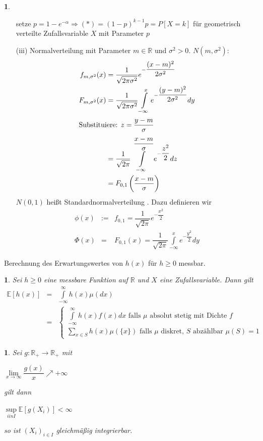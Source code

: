 \documentclass[10pt,a4paper]{report}
\newcommand{\E}{\mathbb{E}}
\newcommand{\R}{\mathbb{R}}
\numberwithin{equation}{section}
\numberwithin{figure}{section}
\theoremstyle{plain}
\theoremstyle{definition}
\newtheorem{example}[thm]{\protect\examplename}
\theoremstyle{remark}
\theoremstyle{plain}
\newtheorem{prop}[thm]{\protect\propositionname}
\providecommand{\examplename}{Beispiel}
\providecommand{\propositionname}{Satz}
\newcommand{\1}{ \mathbb{1} } %
\begin{document}
\begin{example}
\begin{itemize}
    setze $p=1-e^{-\alpha} \Rightarrow (*)=(1-p)^{k-1}p=P[X=k]$ für
    geometrisch verteilte Zufallsvariable $X$ mit Parameter $p$
  \item[(iii)] Normalverteilung mit Parameter $m \in \R$ und
    $\sigma^2>0$. $N(m,\sigma^2)$:
    \begin{align*}
      f_{m,\sigma^2}(x)&=\dfrac{1}{\sqrt{2\pi \sigma^2}} e^{-\dfrac{(x-m)^2}{2\sigma^2}}\\
      F_{m,\sigma^2}(x)&=\dfrac{1}{\sqrt{2\pi \sigma^2}} \int\limits_{-\infty}^xe^{-\dfrac{(y-m)^2}{2\sigma^2}}dy\\
      \intertext{Substituiere: $z=\dfrac{y-m}{\sigma}$}
      &=\dfrac{1}{\sqrt{2\pi}} \int\limits_{-\infty}^{\dfrac{x-m}{\sigma}}e^{-\dfrac{z^2}{2}}dz\\
      &=F_{0,1}\left(\dfrac{x-m}{\sigma}\right)
    \end{align*}
    $N(0,1)$ heißt Standardnormalverteilung . Dazu definieren wir
    \begin{eqnarray*}
      \phi(x)&:=& f_{0,1}=\dfrac{1}{\sqrt{2\pi}}e^{-\dfrac{x^2}{2}}\\
      \Phi(x)&=& F_{0,1}(x)=\dfrac{1}{\sqrt{2\pi}}\int\limits_{-\infty}^x e^{-\dfrac{y^2}{2}}dy
    \end{eqnarray*}
  \end{itemize}
\end{example}
Berechnung des Erwartungswertes von $h(x)$ für $h \geq 0$ messbar.
\begin{prop}  %
  Sei $h\geq 0$ eine messbare Funktion auf $\R$ und $X$ eine Zufallsvariable. Dann
  gilt
  \begin{eqnarray*}
    \E[h(x)] &=& \int\limits_{-\infty}^{\infty} h(x) \mu(dx)\\
    &=& \begin{cases}
      \int\limits_{-\infty}^\infty h(x)f(x) dx \text{ falls } \mu \text{ absolut stetig mit Dichte } f\\
      \sum\limits_{x \in S} h(x)\mu(\{x\}) \text{ falls } \mu \text{ diskret, } S \text{ abzählbar } \mu(S)=1
    \end{cases}
  \end{eqnarray*}
\end{prop}
\begin{prop}
  Sei $g:\R_+ \to \R_+$ mit
  \begin{center}
    $\lim\limits_{x\to \infty} \dfrac{g(x)}{x}\nearrow +\infty$
  \end{center}
  gilt dann
  \begin{center}
    $\sup\limits_{i in I} \E[g(X_i)]<\infty$
  \end{center}
  so ist $(X_i)_{i \in I}$ gleichmäßig integrierbar.
\end{prop}
\end{document}
